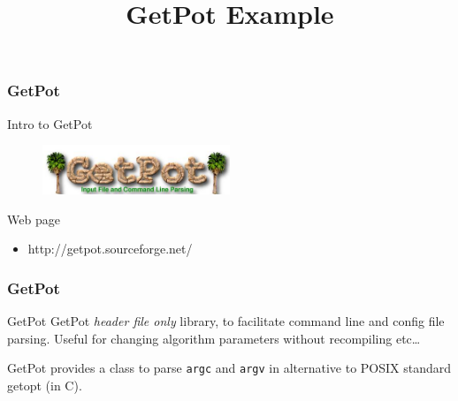 \documentclass[smaller,a4paper]{beamer}
\begin{document}
\title{GetPot Example}
\frame{\titlepage}

\begin{frame}

    \frametitle{GetPot}

    \begin{block}{Intro to}
        \centering
        GetPot
    \end{block}

    \begin{figure}
        \centering
        \includegraphics[width=0.5\textwidth]{images/GetPotLogo2}
    \end{figure}

    \begin{block}{Web page}
        \centering
        \begin{itemize}
            \item http://getpot.sourceforge.net/
        \end{itemize}
    \end{block}

\end{frame}


\begin{frame}

    \frametitle{GetPot}

    \begin{block}{GetPot}
        GetPot \emph{header file only} library,
        to facilitate command line and config file parsing.
        Useful for changing algorithm parameters without recompiling
         etc\ldots
    \end{block}

    \vspace{.2cm}

    \begin{block}{ }
        GetPot provides a class to parse \texttt{argc} and \texttt{argv} in alternative to POSIX standard getopt (in C).
    \end{block}

\end{frame}

\end{document}
